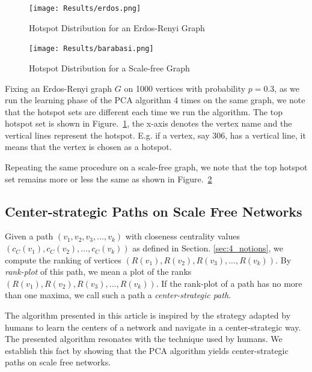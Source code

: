 \documentclass[a4paper,12pt]{article}
\begin{document}
\begin{figure}[htp]
 
\begin{center}
\texttt{[image: Results/erdos.png]}
\caption{Hotspot Distribution for an Erdos-Renyi Graph}
\label{4_hotspot_er}
\end{center}

\end{figure}



\begin{figure}[htp]
\begin{center}
\texttt{[image: Results/barabasi.png]}\\
\caption{Hotspot Distribution for a Scale-free Graph}
\label{4_hotspot_ba}
\end{center}
\end{figure}

Fixing an Erdos-Renyi graph $G$ on 1000 vertices with probability 
$p=0.3$, as we run the learning phase of the PCA algorithm 4 times on the same graph, 
we note that the hotspot sets are different each time we run the algorithm. 
The top hotspot set is shown in Figure.~\ref{4_hotspot_er}, the x-axis denotes the vertex name 
and the vertical lines represent the hotspot. E.g. if a vertex, say 306, 
has a vertical line, it means that the vertex is chosen as a hotspot. 

Repeating the same procedure on a scale-free graph, we note that the top hotspot set
remains more or less the same as shown in Figure.~\ref{4_hotspot_ba}

\subsection{Center-strategic Paths on Scale Free Networks}

Given a path $(v_1,v_2,v_3,...,v_k)$ with closeness centrality 
values $(c_C(v_1),c_C(v_2),...,c_C(v_k))$ as defined in Section. \ref{sec:4_notions},
we compute the ranking of vertices $(R(v_1),R(v_2),R(v_3),...,R(v_k))$. By 
\emph{rank-plot} of this path, 
we mean a plot of the ranks $(R(v_1),R(v_2),R(v_3),...,R(v_k))$. 
If the rank-plot of a path has no more than one maxima, we call such a path 
a \emph{center-strategic path}. 

The algorithm presented in this article is inspired by the strategy
adapted by humans to learn the centers of a network and navigate in a 
center-strategic way. The presented algorithm resonates with the technique used 
by humans. We establish this fact by showing that the PCA algorithm yields 
center-strategic paths on scale free networks.
\end{document}
